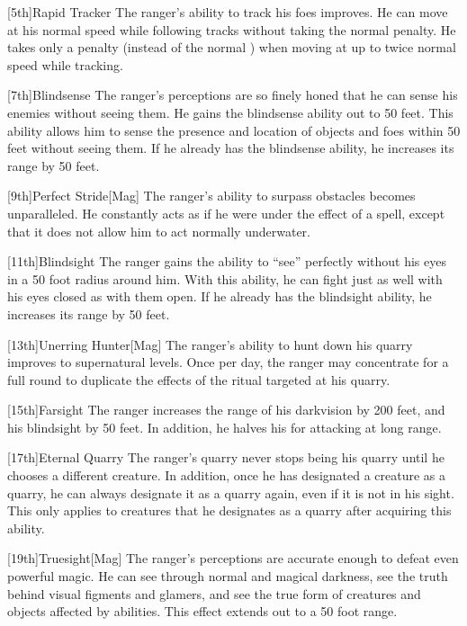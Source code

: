         [5th]{Rapid Tracker}
        The ranger's ability to track his foes improves.
        He can move at his normal speed while following tracks without taking the normal  penalty.
        He takes only a  penalty (instead of the normal ) when moving at up to twice normal speed while tracking.

        [7th]{Blindsense}
        The ranger's perceptions are so finely honed that he can sense his enemies without seeing them.
        He gains the blindsense ability out to 50 feet.
        This ability allows him to sense the presence and location of objects and foes within 50 feet without seeing them.
        If he already has the blindsense ability, he increases its range by 50 feet.

        [9th]{Perfect Stride}[Mag]
        The ranger's ability to surpass obstacles becomes unparalleled.
        He constantly acts as if he were under the effect of a  spell, except that it does not allow him to act normally underwater.

        [11th]{Blindsight}
        The ranger gains the ability to ``see'' perfectly without his eyes in a 50 foot radius around him.
        With this ability, he can fight just as well with his eyes closed as with them open.
        If he already has the blindsight ability, he increases its range by 50 feet.

        [13th]{Unerring Hunter}[Mag]
        The ranger's ability to hunt down his quarry improves to supernatural levels.
        Once per day, the ranger may concentrate for a full round to duplicate the effects of the  ritual targeted at his quarry.

        [15th]{Farsight}
        The ranger increases the range of his darkvision by 200 feet, and his blindsight by 50 feet.
        In addition, he halves his  for attacking at long range.

        [17th]{Eternal Quarry}
        The ranger's quarry never stops being his quarry until he chooses a different creature.
        In addition, once he has designated a creature as a quarry, he can always designate it as a quarry again, even if it is not in his sight.
        This only applies to creatures that he designates as a quarry after acquiring this ability.

        [19th]{Truesight}[Mag]
        The ranger's perceptions are accurate enough to defeat even powerful magic.
        He can see through normal and magical darkness, see the truth behind visual figments and glamers, and see the true form of creatures and objects affected by  abilities.
        This effect extends out to a 50 foot range.

